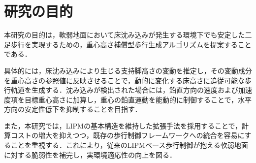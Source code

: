 \section{研究の目的}

本研究の目的は，軟弱地面において床沈み込みが発生する環境下でも安定した二足歩行を実現するための，重心高さ補償型歩行生成アルゴリズムを提案することである．

具体的には，床沈み込みにより生じる支持脚高さの変動を推定し，その変動成分を重心高さの参照値に反映させることで，動的に変化する床高さに追従可能な歩行軌道を生成する．沈み込みが検出された場合には，鉛直方向の速度および加速度項を目標重心高さに加算し，重心の鉛直運動を能動的に制御することで，水平方向の安定性低下を抑制することを目指す．

また，本研究では，LIPMの基本構造を維持した拡張手法を採用することで，計算コストの増大を抑えつつ，既存の歩行制御フレームワークへの統合を容易にすることを重視する．これにより，従来のLIPMベース歩行制御が抱える軟弱地面に対する脆弱性を補完し，実環境適応性の向上を図る．